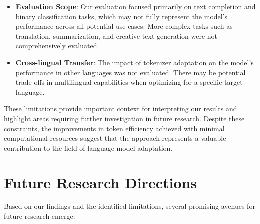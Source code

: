 \begin{itemize}
    \item \textbf{Evaluation Scope}: Our evaluation focused primarily on text completion and binary classification tasks, which may not fully represent the model's performance across all potential use cases. More complex tasks such as translation, summarization, and creative text generation were not comprehensively evaluated.
    
    \item \textbf{Cross-lingual Transfer}: The impact of tokenizer adaptation on the model's performance in other languages was not evaluated. There may be potential trade-offs in multilingual capabilities when optimizing for a specific target language.

\end{itemize}

These limitations provide important context for interpreting our results and highlight areas requiring further investigation in future research. Despite these constraints, the improvements in token efficiency achieved with minimal computational resources suggest that the approach represents a valuable contribution to the field of language model adaptation.

\section{Future Research Directions}
Based on our findings and the identified limitations, several promising avenues for future research emerge:

